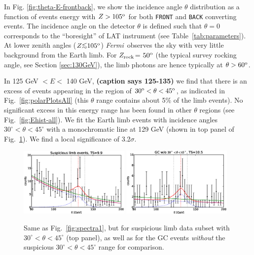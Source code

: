 \documentclass[aps,twocolumn,prd,superscriptaddress,showpacs,nofootinbib,fixfloat]{revtex4}
\newcommand{\Fermi}{{\slshape Fermi}}
\newcommand{\degree}{^{\rm o}}
\newcommand{\zrock}{$Z_{\rm rock}$}
\def\la{\vcenter{\hbox{$<$}\offinterlineskip\hbox{$\sim$}}}
\newcommand\Refsec[1]{Section \ref{sec:#1}}
\begin{document}
In Fig. \ref{fig:theta-E-frontback}, we show the incidence angle
$\theta$ distribution as a function of events energy with $Z
> 105\degree$ for both \texttt{FRONT} and \texttt{BACK}
converting events.  The incidence angle on the detector
$\theta$ is defined such that $\theta=0$ corresponds to the
``boresight'' of LAT instrument (see
Table~\ref{tab:parameters}).  At lower zenith angles ($Z \la
105\degree$) \Fermi\ observes the sky with very little
background from the Earth limb.  For \zrock = $50\degree$
(the typical survey rocking angle, see \Refsec{130GeV}), the
limb photons are hence typically at $\theta > 60\degree$.

In 125 GeV $< E <$ 140 GeV, {\bf (caption says 125-135) }we find that there is an excess
of events appearing in the region of $30\degree < \theta <
45\degree$, as indicated in
Fig.~\ref{fig:polarPlotsAll} (this $\theta$ range contains
about 5\% of the limb events). No significant excess in this
energy range has been found in other $\theta$ regions (see
Fig.~\ref{fig:Ehist-all}). We fit the Earth limb events with
incidence angles $30^\circ<\theta<45^\circ$ with a
monochromatic line at 129 GeV (shown in top panel of
Fig.~\ref{fig:spectra2}). We find a local significance of
3.2$\sigma$.

\begin{figure}
  \centering
  \includegraphics[width=0.48\textwidth]{plots/counts_suspiciousLimb.eps}
  \includegraphics[width=0.48\textwidth]{plots/counts_GC_wo3045.eps}
  \caption{Same as Fig.~\ref{fig:spectra1}, but for
  suspicious limb data subset with
  $30^\circ<\theta<45^\circ$ (top panel), as well as for the
  GC events \emph{without} the suspicious
  $30^\circ<\theta<45^\circ$ range for comparison.}
  \label{fig:spectra2}
\end{figure}
\end{document}
